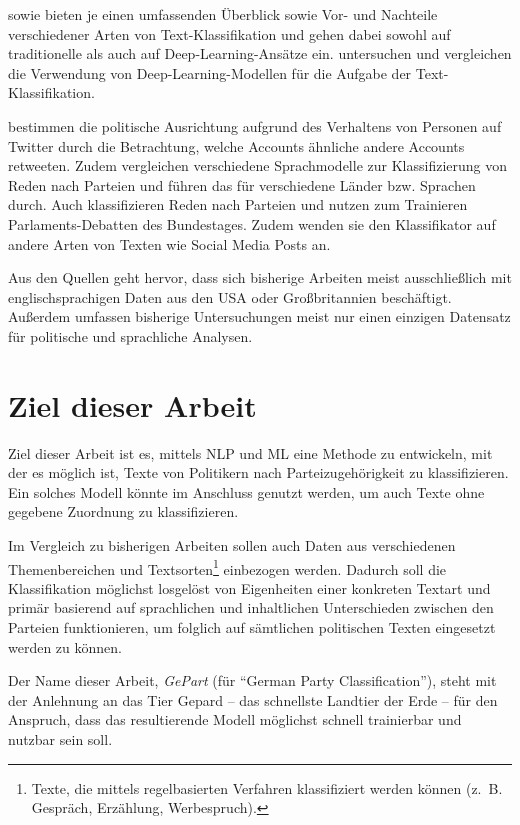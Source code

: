 \textcite{li_survey_2021} sowie \textcite{kowsari_text_2019} bieten je einen umfassenden Überblick sowie Vor- und Nachteile verschiedener Arten von Text-Klassifikation und gehen dabei sowohl auf traditionelle als auch auf Deep-Learning-Ansätze ein.
\textcite{minaee_deep_2022} untersuchen und vergleichen die Verwendung von Deep-Learning-Modellen für die Aufgabe der Text-Klassifikation.

\textcite{wong_quantifying_2016} bestimmen die politische Ausrichtung aufgrund des Verhaltens von Personen auf Twitter durch die Betrachtung, welche Accounts ähnliche andere Accounts retweeten.
Zudem vergleichen \textcite{doan_using_2022} verschiedene Sprachmodelle zur Klassifizierung von Reden nach Parteien und führen das für verschiedene Länder bzw. Sprachen durch.
Auch \textcite{biessmann_predicting_2016} klassifizieren Reden nach Parteien und nutzen zum Trainieren Parlaments-Debatten des Bundestages. Zudem wenden sie den Klassifikator auf andere Arten von Texten wie Social Media Posts an.

Aus den Quellen geht hervor, dass sich bisherige Arbeiten meist ausschließlich mit englischsprachigen Daten aus den USA oder Großbritannien beschäftigt. Außerdem umfassen bisherige Untersuchungen meist nur einen einzigen Datensatz für politische und sprachliche Analysen.

\section{Ziel dieser Arbeit} \label{sec:thesisGoal}

Ziel dieser Arbeit ist es, mittels \ac{NLP} und \ac{ML} eine Methode zu entwickeln, mit der es möglich ist, Texte von Politikern nach Parteizugehörigkeit zu klassifizieren. Ein solches Modell könnte im Anschluss genutzt werden, um auch Texte ohne gegebene Zuordnung zu klassifizieren.

Im Vergleich zu bisherigen Arbeiten sollen auch Daten aus verschiedenen Themenbereichen und Textsorten\footnote{Texte, die mittels regelbasierten Verfahren klassifiziert werden können (z. B. Gespräch, Erzählung, Werbespruch).} einbezogen werden. Dadurch soll die Klassifikation möglichst losgelöst von Eigenheiten einer konkreten Textart und primär basierend auf sprachlichen und inhaltlichen Unterschieden zwischen den Parteien funktionieren, um folglich auf sämtlichen politischen Texten eingesetzt werden zu können.

Der Name dieser Arbeit, \textit{GePart} (für \enquote{German Party Classification}), steht mit der Anlehnung an das Tier Gepard -- das schnellste Landtier der Erde -- für den Anspruch, dass das resultierende Modell möglichst schnell trainierbar und nutzbar sein soll.

